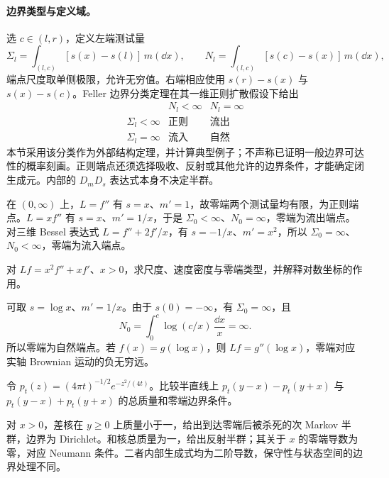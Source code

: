 \paragraph{边界类型与定义域。}
选 $c\in(l,r)$，定义左端测试量
\[
 \Sigma_l=\int_{(l,c)}[s(x)-s(l)]\,m(\dd x),\qquad
 N_l=\int_{(l,c)}[s(c)-s(x)]\,m(\dd x),
\]
端点尺度取单侧极限，允许无穷值。右端相应使用 $s(r)-s(x)$ 与 $s(x)-s(c)$。Feller 边界分类定理在其一维正则扩散假设下给出
\[
 \begin{array}{c|cc}
 &N_l<\infty&N_l=\infty\\\hline
 \Sigma_l<\infty&\text{正则}&\text{流出}\\
 \Sigma_l=\infty&\text{流入}&\text{自然}
 \end{array}
\]
本节采用该分类作为外部结构定理，并计算典型例子；不声称已证明一般边界可达性的概率刻画。正则端点还须选择吸收、反射或其他允许的边界条件，才能确定闭生成元。内部的 $D_mD_s$ 表达式本身不决定半群。

\begin{example}[三种左端行为]
在 $(0,\infty)$ 上，$L=f''$ 有 $s=x$、$m'=1$，故零端两个测试量均有限，为正则端点。$L=xf''$ 有 $s=x$、$m'=1/x$，于是 $\Sigma_0<\infty$、$N_0=\infty$，零端为流出端点。对三维 Bessel 表达式 $L=f''+2f'/x$，有 $s=-1/x$、$m'=x^2$，所以 $\Sigma_0=\infty$、$N_0<\infty$，零端为流入端点。
\end{example}

\begin{exercise}[自然端点]\label{ex:y13-natural-boundary}
对 $Lf=x^2f''+xf'$、$x>0$，求尺度、速度密度与零端类型，并解释对数坐标的作用。
\end{exercise}
\begin{solution}
可取 $s=\log x$、$m'=1/x$。由于 $s(0)=-\infty$，有 $\Sigma_0=\infty$，且
\[
 N_0=\int_0^c\log(c/x)\,\frac{\dd x}{x}=\infty.
\]
所以零端为自然端点。若 $f(x)=g(\log x)$，则 $Lf=g''(\log x)$，零端对应实轴 Brownian 运动的负无穷远。
\end{solution}

\begin{exercise}[边界条件改变转移]\label{ex:y13-boundary-kernels}
令 $p_t(z)=(4\pi t)^{-1/2}e^{-z^2/(4t)}$。比较半直线上 $p_t(y-x)-p_t(y+x)$ 与 $p_t(y-x)+p_t(y+x)$ 的总质量和零端边界条件。
\end{exercise}
\begin{solution}
对 $x>0$，差核在 $y\ge0$ 上质量小于一，给出到达零端后被杀死的次 Markov 半群，边界为 Dirichlet。和核总质量为一，给出反射半群；其关于 $x$ 的零端导数为零，对应 Neumann 条件。二者内部生成式均为二阶导数，保守性与状态空间的边界处理不同。
\end{solution}
